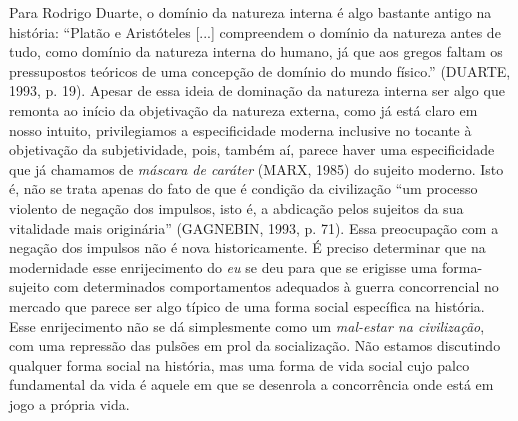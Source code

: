 Para Rodrigo Duarte, o domínio da natureza interna é algo bastante
antigo na história: ``Platão e Aristóteles {[}...{]} compreendem o
domínio da natureza antes de tudo, como domínio da natureza interna do
humano, já que aos gregos faltam os pressupostos teóricos de uma
concepção de domínio do mundo físico.'' (DUARTE, 1993, p. 19). Apesar de
essa ideia de dominação da natureza interna ser algo que remonta ao
início da objetivação da natureza externa, como já está claro em nosso
intuito, privilegiamos a especificidade moderna inclusive no tocante à
objetivação da subjetividade, pois, também aí, parece haver uma
especificidade que já chamamos de \emph{máscara de caráter} (MARX, 1985)
do sujeito moderno. Isto é, não se trata apenas do fato de que é
condição da civilização ``um processo violento de negação dos impulsos,
isto é, a abdicação pelos sujeitos da sua vitalidade mais originária''
(GAGNEBIN, 1993, p. 71). Essa preocupação com a negação dos impulsos não
é nova historicamente. É preciso determinar que na modernidade esse
enrijecimento do \emph{eu} se deu para que se erigisse uma forma-sujeito
com determinados comportamentos adequados à guerra concorrencial no
mercado que parece ser algo típico de uma forma social específica na
história. Esse enrijecimento não se dá simplesmente como um
\emph{mal-estar na civilização}, com uma repressão das pulsões em prol
da socialização. Não estamos discutindo qualquer forma social na
história, mas uma forma de vida social cujo palco fundamental da vida é
aquele em que se desenrola a concorrência onde está em jogo a própria
vida.

